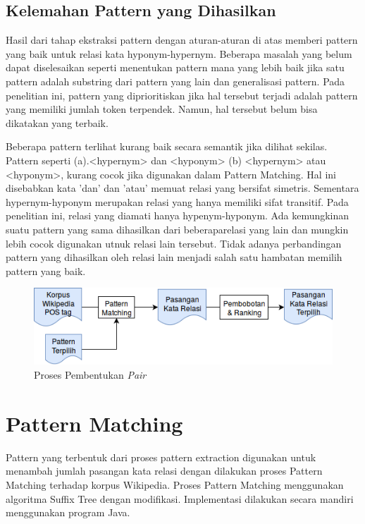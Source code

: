 \subsection{Kelemahan Pattern yang Dihasilkan}
Hasil dari tahap ekstraksi pattern dengan aturan-aturan di atas memberi pattern yang baik untuk relasi kata hyponym-hypernym. Beberapa masalah yang belum dapat diselesaikan seperti menentukan pattern mana yang lebih baik jika satu pattern adalah substring dari pattern yang lain dan generalisasi pattern. Pada penelitian ini, pattern yang diprioritiskan jika hal tersebut terjadi adalah pattern yang memiliki jumlah token terpendek. Namun, hal tersebut belum bisa dikatakan yang terbaik.

Beberapa pattern terlihat kurang baik secara semantik jika dilihat sekilas. Pattern seperti (a).<hypernym> dan <hyponym> (b) <hypernym> atau <hyponym>, kurang cocok jika digunakan dalam Pattern Matching. Hal ini disebabkan kata 'dan' dan 'atau' memuat relasi yang bersifat simetris. Sementara hypernym-hyponym merupakan relasi yang hanya memiliki sifat transitif. Pada penelitian ini, relasi yang  diamati hanya hypenym-hyponym. Ada kemungkinan suatu pattern yang sama dihasilkan dari beberaparelasi yang lain dan mungkin lebih cocok digunakan utnuk relasi lain tersebut. Tidak adanya perbandingan pattern yang dihasilkan oleh relasi lain menjadi salah satu hambatan memilih pattern yang baik.


\begin{figure}
    \centering
    \includegraphics[width=\linewidth]{pics/Pic04-PatternMatching}
    \caption{Proses Pembentukan \textit{Pair}}
    \label{fig:pattern-matching}
\end{figure}
\section{Pattern Matching}
Pattern yang terbentuk dari proses pattern extraction digunakan untuk menambah jumlah pasangan kata relasi dengan dilakukan proses Pattern Matching terhadap korpus Wikipedia. Proses Pattern Matching menggunakan algoritma Suffix Tree dengan modifikasi. Implementasi dilakukan secara mandiri menggunakan program Java.

